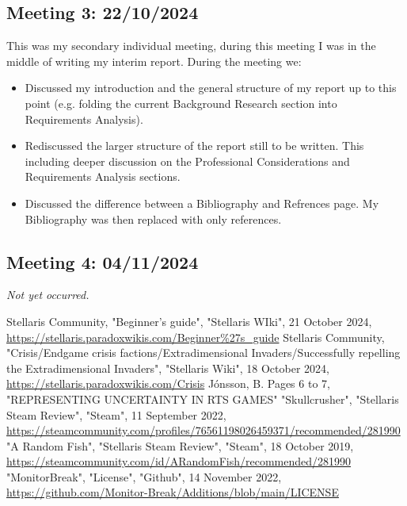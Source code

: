 \documentclass{report}
\begin{document}
\subsection{Meeting 3: 22/10/2024}

This was my secondary individual meeting, during this meeting I was in the middle of writing my interim report. During the meeting we:
\begin{itemize}
  \item Discussed my introduction and the general structure of my report up to this point (e.g. folding the current Background Research section into Requirements Analysis).
  \item Rediscussed the larger structure of the report still to be written. This including deeper discussion on the Professional Considerations and Requirements Analysis sections.
  \item Discussed the difference between a Bibliography and Refrences page. My Bibliography was then replaced with only references.
\end{itemize}

\subsection{Meeting 4: 04/11/2024}

\textit{Not yet occurred.}

\renewcommand\bibname{References}
\begin{thebibliography}{9}
Stellaris Community, "Beginner's guide", "Stellaris WIki", 21 October 2024, \href{https://stellaris.paradoxwikis.com/Beginner\%27s_guide}{https://stellaris.paradoxwikis.com/Beginner\%27s\_guide}
Stellaris Community, "Crisis/Endgame crisis factions/Extradimensional Invaders/Successfully repelling the Extradimensional Invaders", "Stellaris Wiki", 18 October 2024, \href{https://stellaris.paradoxwikis.com/Crisis#Successfully_repelling_the_Extradimensional_Invaders, Crisis Solution Link}{https://stellaris.paradoxwikis.com/Crisis}
Jónsson, B. Pages 6 to 7, "REPRESENTING UNCERTAINTY IN RTS GAMES"
"Skullcrusher", "Stellaris Steam Review", "Steam", 11 September 2022, \href{https://steamcommunity.com/profiles/76561198026459371/recommended/281990, "Review Link"}{https://steamcommunity.com/profiles/76561198026459371/recommended/281990}
"A Random Fish", "Stellaris Steam Review", "Steam", 18 October 2019, \href{https://steamcommunity.com/id/ARandomFish/recommended/281990, "Review Link"}{https://steamcommunity.com/id/ARandomFish/recommended/281990}
"MonitorBreak", "License", "Github", 14 November 2022, \href{https://github.com/Monitor-Break/Additions/blob/main/LICENSE}{https://github.com/Monitor-Break/Additions/blob/main/LICENSE}
\end{thebibliography}
\end{document}
